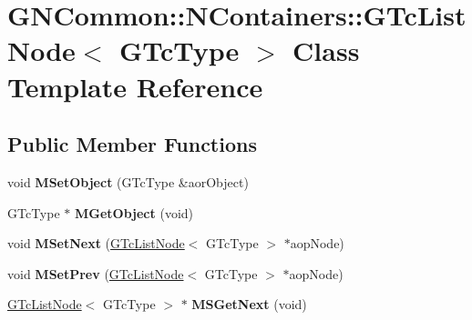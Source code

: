 \hypertarget{class_g_n_common_1_1_n_containers_1_1_g_tc_list_node}{}\section{G\+N\+Common\+:\+:N\+Containers\+:\+:G\+Tc\+List\+Node$<$ G\+Tc\+Type $>$ Class Template Reference}
\label{class_g_n_common_1_1_n_containers_1_1_g_tc_list_node}
\subsection*{Public Member Functions}
\begin{DoxyCompactItemize}
\item 
\mbox{\label{class_g_n_common_1_1_n_containers_1_1_g_tc_list_node_a86d95731366df231f1b666a1deea2452}} 
void {\bfseries M\+Set\+Object} (G\+Tc\+Type \&aor\+Object)
\item 
\mbox{\label{class_g_n_common_1_1_n_containers_1_1_g_tc_list_node_a384f01990e3583745ad523f98cd9cb35}} 
G\+Tc\+Type $\ast$ {\bfseries M\+Get\+Object} (void)
\item 
\mbox{\label{class_g_n_common_1_1_n_containers_1_1_g_tc_list_node_a732112aa53aa5c90521fa195023934da}} 
void {\bfseries M\+Set\+Next} (\mbox{\hyperlink{class_g_n_common_1_1_n_containers_1_1_g_tc_list_node}{G\+Tc\+List\+Node}}$<$ G\+Tc\+Type $>$ $\ast$aop\+Node)
\item 
\mbox{\label{class_g_n_common_1_1_n_containers_1_1_g_tc_list_node_a09704031a826c226800f987aabef2dad}} 
void {\bfseries M\+Set\+Prev} (\mbox{\hyperlink{class_g_n_common_1_1_n_containers_1_1_g_tc_list_node}{G\+Tc\+List\+Node}}$<$ G\+Tc\+Type $>$ $\ast$aop\+Node)
\item 
\mbox{\label{class_g_n_common_1_1_n_containers_1_1_g_tc_list_node_a06b8ad652f01c74533b1058ce2d3d67f}} 
\mbox{\hyperlink{class_g_n_common_1_1_n_containers_1_1_g_tc_list_node}{G\+Tc\+List\+Node}}$<$ G\+Tc\+Type $>$ $\ast$ {\bfseries M\+S\+Get\+Next} (void)

\end{DoxyCompactItemize}
